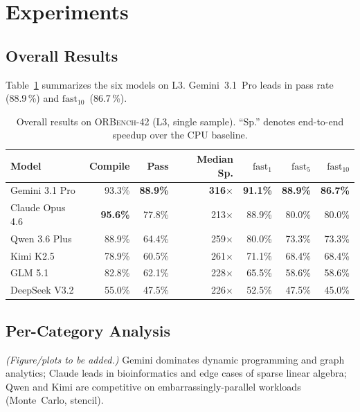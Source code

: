 \documentclass{article}
\begin{document}
\section{Experiments}
\label{sec:results}

\subsection{Overall Results}

Table~\ref{tab:overall} summarizes the six models on L3.
Gemini~3.1~Pro leads in pass rate (88.9\,\%) and
$\mathrm{fast}_{10}$~(86.7\,\%).

\begin{table}[ht]
\centering
\small
\caption{Overall results on \textsc{ORBench}-42 (L3, single sample).
``Sp.'' denotes end-to-end speedup over the CPU baseline.}
\label{tab:overall}
\begin{tabular}{@{}lrrrrrr@{}}
\toprule
\textbf{Model} & \textbf{Compile} & \textbf{Pass} &
\textbf{Median Sp.} & \textbf{$\mathrm{fast}_1$} &
\textbf{$\mathrm{fast}_5$} & \textbf{$\mathrm{fast}_{10}$} \\
\midrule
Gemini 3.1 Pro     & 93.3\% & \textbf{88.9\%} & \textbf{316$\times$} & \textbf{91.1\%} & \textbf{88.9\%} & \textbf{86.7\%} \\
Claude Opus 4.6    & \textbf{95.6\%} & 77.8\% & 213$\times$ & 88.9\% & 80.0\% & 80.0\% \\
Qwen 3.6 Plus      & 88.9\% & 64.4\% & 259$\times$ & 80.0\% & 73.3\% & 73.3\% \\
Kimi K2.5          & 78.9\% & 60.5\% & 261$\times$ & 71.1\% & 68.4\% & 68.4\% \\
GLM 5.1            & 82.8\% & 62.1\% & 228$\times$ & 65.5\% & 58.6\% & 58.6\% \\
DeepSeek V3.2      & 55.0\% & 47.5\% & 226$\times$ & 52.5\% & 47.5\% & 45.0\% \\
\bottomrule
\end{tabular}
\end{table}

\subsection{Per-Category Analysis}

\emph{(Figure/plots to be added.)} Gemini dominates dynamic
programming and graph analytics; Claude leads in bioinformatics and
edge cases of sparse linear algebra; Qwen and Kimi are competitive on
embarrassingly-parallel workloads (Monte~Carlo, stencil).
\end{document}
